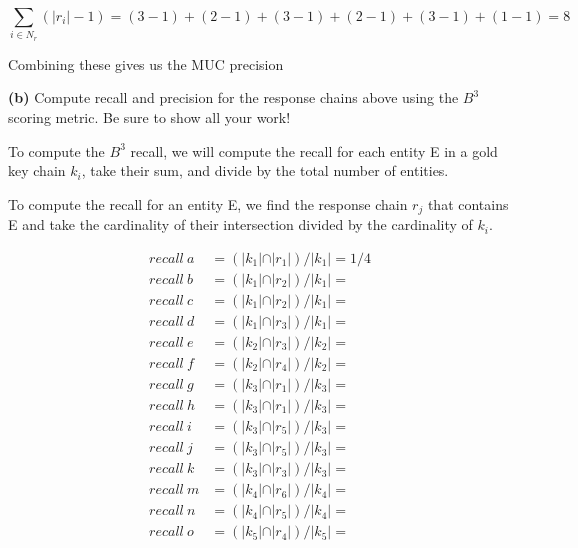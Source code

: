 \documentclass[11pt]{article}
\renewcommand\part[1]{\vspace{.10in}\textbf{(#1)}}
\begin{document}
$$\sum_{i \in N_r} ( \vert r_i \vert - 1) = (3 - 1) + (2 - 1) + (3 - 1) + (2 - 1) + (3 - 1) + (1 - 1) = 8$$

Combining these gives us the MUC precision


\part{b} Compute recall and precision for the response chains above using the $B^3$ scoring metric. Be sure to show all your work!

To compute the $B^3$ recall, we will compute the recall for each entity E in a gold key chain $k_i$, take their sum, and divide by the total number of entities.

To compute the recall for an entity E, we find the response chain $r_j$ that contains E and take the cardinality of their intersection divided by the cardinality of $k_i$.

\begin{align*}
recall \ a &= (\vert k_1 \vert \cap \vert r_1 \vert) / \vert k_1 \vert = 1 / 4 \\
recall \ b &= (\vert k_1 \vert \cap \vert r_2 \vert) / \vert k_1 \vert =  \\ 
recall \ c &= (\vert k_1 \vert \cap \vert r_2 \vert) / \vert k_1 \vert =  \\
recall \ d &= (\vert k_1 \vert \cap \vert r_3 \vert) / \vert k_1 \vert =  \\ 
recall \ e &= (\vert k_2 \vert \cap \vert r_3 \vert) / \vert k_2 \vert =  \\ 
recall \ f &= (\vert k_2 \vert \cap \vert r_4 \vert) / \vert k_2 \vert =  \\
recall \ g &= (\vert k_3 \vert \cap \vert r_1 \vert) / \vert k_3 \vert =  \\ 
recall \ h &= (\vert k_3 \vert \cap \vert r_1 \vert) / \vert k_3 \vert =  \\
recall \ i &= (\vert k_3 \vert \cap \vert r_5 \vert) / \vert k_3 \vert =  \\
recall \ j &= (\vert k_3 \vert \cap \vert r_5 \vert) / \vert k_3 \vert =  \\
recall \ k &= (\vert k_3 \vert \cap \vert r_3 \vert) / \vert k_3 \vert =  \\
recall \ m &= (\vert k_4 \vert \cap \vert r_6 \vert) / \vert k_4 \vert =  \\
recall \ n &= (\vert k_4 \vert \cap \vert r_5 \vert) / \vert k_4 \vert =  \\
recall \ o &= (\vert k_5 \vert \cap \vert r_4 \vert) / \vert k_5 \vert = 
\end{align*}
\end{document}

